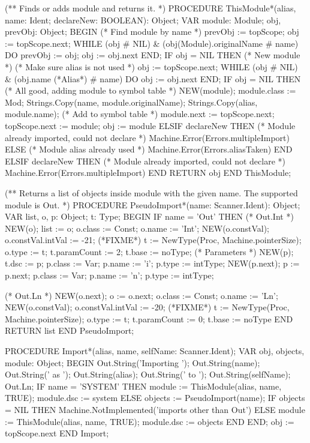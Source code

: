 \documentclass[utf8]{lgu}
\begin{document}
\begin{modula2long}
(** Finds or adds module and returns it. *)
PROCEDURE ThisModule*(alias, name: Ident; declareNew: BOOLEAN): Object;
VAR module: Module;
  obj, prevObj: Object;
BEGIN
  (* Find module by name *)
  prevObj := topScope;
  obj := topScope.next;
  WHILE (obj # NIL) & (obj(Module).originalName # name) DO
    prevObj := obj;
    obj := obj.next
  END;
  IF obj = NIL THEN (* New module *)
    (* Make sure alias is not used *)
    obj := topScope.next;
    WHILE (obj # NIL) & (obj.name (*Alias*) # name) DO obj := obj.next END;
    IF obj = NIL THEN (* All good, adding module to symbol table *)
      NEW(module);
      module.class := Mod;
      Strings.Copy(name, module.originalName);
      Strings.Copy(alias, module.name);
      (* Add to symbol table *)
      module.next := topScope.next;
      topScope.next := module;
      obj := module
    ELSIF declareNew THEN (* Module already imported, could not declare *)
      Machine.Error(Errors.multipleImport)
    ELSE (* Module alias already used *)
      Machine.Error(Errors.aliasTaken)
    END
  ELSIF declareNew THEN (* Module already imported, could not declare *)
    Machine.Error(Errors.multipleImport)
  END
RETURN obj END ThisModule;

(** Returns a list of objects inside module with the given name.
     The supported module is Out. *)
PROCEDURE PseudoImport*(name: Scanner.Ident): Object;
VAR list, o, p: Object;
  t: Type;
BEGIN
  IF name = 'Out' THEN
    (* Out.Int *)
    NEW(o);
    list := o;
    o.class := Const;
    o.name := 'Int';
    NEW(o.constVal);
    o.constVal.intVal := -21; (*FIXME*)
    t := NewType(Proc, Machine.pointerSize);
    o.type := t;
    t.paramCount := 2;
    t.base := noType;
    (* Parameters *)
    NEW(p);
    t.dsc := p;
    p.class := Var;
    p.name := 'i';
    p.type := intType;
    NEW(p.next);
    p := p.next;
    p.class := Var;
    p.name := 'n';
    p.type := intType;

    (* Out.Ln *)
    NEW(o.next);
    o := o.next;
    o.class := Const;
    o.name := 'Ln';
    NEW(o.constVal);
    o.constVal.intVal := -20; (*FIXME*)
    t := NewType(Proc, Machine.pointerSize);
    o.type := t;
    t.paramCount := 0;
    t.base := noType
  END
RETURN list END PseudoImport;

PROCEDURE Import*(alias, name, selfName: Scanner.Ident);
VAR obj, objects, module: Object;
BEGIN
  Out.String('Importing '); Out.String(name);
  Out.String(' as '); Out.String(alias);
  Out.String(' to '); Out.String(selfName);
  Out.Ln;
  IF name = 'SYSTEM' THEN
    module := ThisModule(alias, name, TRUE);
    module.dsc := system
  ELSE
    objects := PseudoImport(name);
    IF objects = NIL THEN
      Machine.NotImplemented('imports other than Out')
    ELSE
      module := ThisModule(alias, name, TRUE);
      module.dsc := objects
    END
  END;
  obj := topScope.next
END Import;


\end{modula2long}
\end{document}
